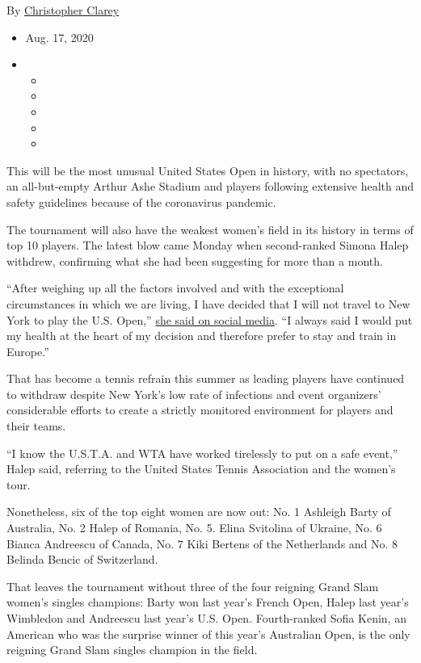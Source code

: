 By
\href{https://www.nytimes3xbfgragh.onion/by/christopher-clarey}{Christopher
Clarey}

\begin{itemize}
\item
  Aug. 17, 2020
\item
  \begin{itemize}
  \item
  \item
  \item
  \item
  \item
  \end{itemize}
\end{itemize}

This will be the most unusual United States Open in history, with no
spectators, an all-but-empty Arthur Ashe Stadium and players following
extensive health and safety guidelines because of the coronavirus
pandemic.

The tournament will also have the weakest women's field in its history
in terms of top 10 players. The latest blow came Monday when
second-ranked Simona Halep withdrew, confirming what she had been
suggesting for more than a month.

``After weighing up all the factors involved and with the exceptional
circumstances in which we are living, I have decided that I will not
travel to New York to play the U.S. Open,''
\href{https://twitter.com/Simona_Halep/status/1295329524813639681}{she
said on social media}. ``I always said I would put my health at the
heart of my decision and therefore prefer to stay and train in Europe.''

That has become a tennis refrain this summer as leading players have
continued to withdraw despite New York's low rate of infections and
event organizers' considerable efforts to create a strictly monitored
environment for players and their teams.

``I know the U.S.T.A. and WTA have worked tirelessly to put on a safe
event,'' Halep said, referring to the United States Tennis Association
and the women's tour.

Nonetheless, six of the top eight women are now out: No. 1 Ashleigh
Barty of Australia, No. 2 Halep of Romania, No. 5. Elina Svitolina of
Ukraine, No. 6 Bianca Andreescu of Canada, No. 7 Kiki Bertens of the
Netherlands and No. 8 Belinda Bencic of Switzerland.

That leaves the tournament without three of the four reigning Grand Slam
women's singles champions: Barty won last year's French Open, Halep last
year's Wimbledon and Andreescu last year's U.S. Open. Fourth-ranked
Sofia Kenin, an American who was the surprise winner of this year's
Australian Open, is the only reigning Grand Slam singles champion in the
field.

